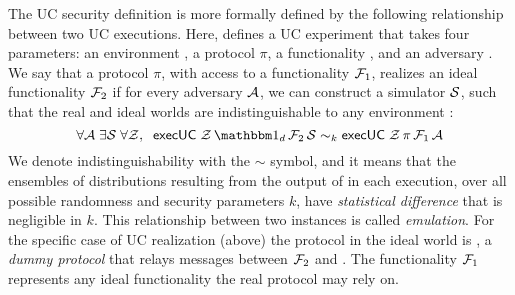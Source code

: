 
The UC security definition is more formally defined by the following relationship between two UC executions. 
Here,  defines a UC experiment that takes four parameters: an environment \Z, a protocol $\pi$, a functionality \F, and an adversary \A.
We say that a protocol $\pi$, with access to a functionality $\mathcal{F}_1$, realizes an ideal functionality $\mathcal{F}_2$
if for every adversary $\mathcal{A}$, we can construct a simulator $\mathcal{S}$, such that the real and ideal worlds are indistinguishable to any environment \Z:
\begin{equation}
  \label{eqn:emulation}
  \forall \A \; \exists \Sim \; \forall \Z, \; \; \msf{execUC} \; \Z \, \idealP \, \F_2 \, \Sim \sim_k \msf{execUC} \; \Z \, \pi \, \F_1 \, \A
\end{equation}
We denote indistinguishability with the $\sim$ symbol, and it means that the ensembles of distributions resulting from the output of \Z
in each execution, over all possible randomness and security parameters $k$, have \emph{statistical difference} that is negligible in $k$.
This relationship between two  instances is called \emph{emulation}. 
For the specific case of UC realization (above) the protocol in the ideal world is \idealP, a \emph{dummy protocol} that relays messages between $\mathcal{F}_2$ and \Z.
The functionality $\mathcal{F}_1$ represents any ideal functionality the real protocol may rely on.

